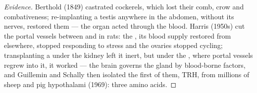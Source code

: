 \begin{proof}[Evidence]
Berthold (1849) castrated cockerels, which lost their comb, crow and
combativeness; re-implanting a testis anywhere in the abdomen, without
its nerves, restored them --- the organ acted through the blood. Harris
(1950s) cut the portal vessels between  and  in
rats: the , its blood supply restored from elsewhere, stopped
responding to stress and the ovaries stopped cycling; transplanting a
 under the kidney left it inert, but under the ,
where portal vessels regrew into it, it worked --- the brain governs the
gland by blood-borne factors, and Guillemin and Schally then isolated
the first of them, TRH, from millions of sheep and pig hypothalami
(1969): three amino acids.
\end{proof}

